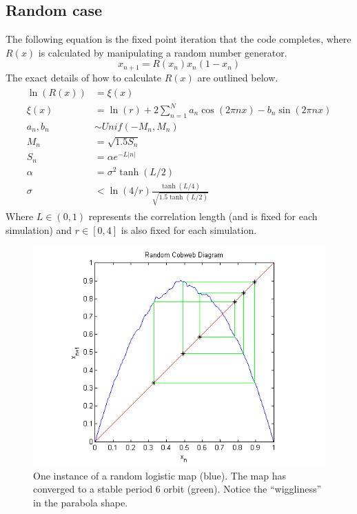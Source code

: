 \documentclass[12pt]{article}
\begin{document}
\subsection{Random case}
The following equation is the fixed point iteration that the code
completes, where $R(x)$ is calculated by manipulating a random number generator.
\begin{equation*}
x_{n+1} = R(x_n)x_n(1-x_n)
\end{equation*}
The exact details of how to calculate $R(x)$ are outlined below.
\begin{align*}
\begin{split}
\ln(R(x)) &= \xi(x)\\
\xi(x) &= \ln(r) + 2\sum^N_{n=1}a_n\cos(2\pi nx)-b_n\sin(2\pi nx)\\
a_n,b_n &\sim Unif(-M_n,M_n)\\
M_n &= \sqrt{1.5S_n}\\
S_n &= \alpha e^{-L|n|}\\
\alpha &= \sigma^2 \tanh(L/2)\\
\sigma &< \ln(4/r)\frac{\tanh(L/4)}{\sqrt{1.5\tanh(L/2)}}
\end{split}
\end{align*}
Where $L \in (0,1)$ represents the correlation length (and is fixed
for each simulation) and $r \in [0,4]$ is also fixed for each
simulation. 
\begin{figure}[H]
	\begin{center}
		\includegraphics[scale=0.7]{rand_cobweb}
\caption{One instance of a random logistic map (blue). The map has
  converged to a stable period 6 orbit (green). Notice the
  ``wiggliness'' in the parabola shape.}
	\end{center}
\end{figure}
\end{document}
